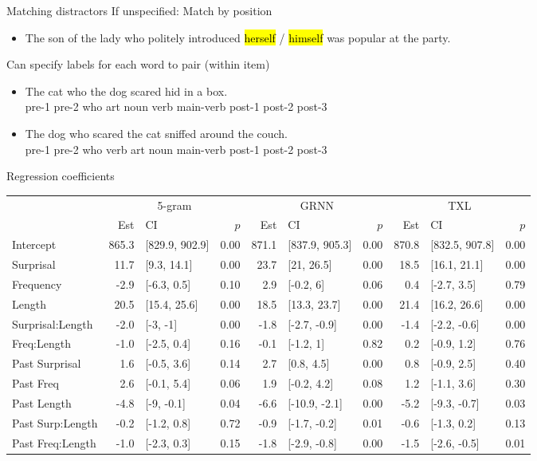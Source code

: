 \documentclass[ 12pt, xcolor=beamer,table,usenames,dvipsnames, ignorenonframetext, ngerman]{beamer}
\makeatletter
\let\HL\hl
\renewcommand\hl{%
	\let\set@color\beamerorig@set@color
	\let\reset@color\beamerorig@reset@color
	\HL}
\makeatother
\begin{document}
\appendix

\begin{frame}{Matching distractors}
If unspecified: Match by position
\begin{itemize}
	\item The son of the lady who politely introduced  \hl{herself} / \hl{himself} was popular at the party.
\end{itemize}
Can specify labels for each word to pair (within item)
\begin{itemize}
	\item The cat who the dog scared hid in a box.\\pre-1 pre-2 who art noun verb main-verb post-1 post-2 post-3
\item The dog who scared the cat sniffed around the couch.\\ pre-1 pre-2 who verb art noun main-verb post-1 post-2 post-3
\end{itemize}
\end{frame}


\begin{frame}{Regression coefficients}
\begin{tiny}
\begin{tabular}{l|rlr|rlr|rlr}
	\hline
	&\multicolumn{3}{c|}{5-gram}&\multicolumn{3}{c|}{GRNN}&\multicolumn{3}{c}{TXL}\\
	& Est & CI & $p$ & Est & CI & $p$ &Est & CI & $p$ \\ 
	\hline
	Intercept & 865.3 & [829.9, 902.9] & 0.00 & 871.1 & [837.9, 905.3] & 0.00 & 870.8 & [832.5, 907.8] & 0.00 \\ 
	Surprisal & 11.7 & [9.3, 14.1] & 0.00 & 23.7 & [21, 26.5] & 0.00 & 18.5 & [16.1, 21.1] & 0.00 \\ 
	Frequency & -2.9 & [-6.3, 0.5] & 0.10 & 2.9 & [-0.2, 6] & 0.06 & 0.4 & [-2.7, 3.5] & 0.79 \\ 
	Length & 20.5 & [15.4, 25.6] & 0.00 & 18.5 & [13.3, 23.7] & 0.00 & 21.4 & [16.2, 26.6] & 0.00 \\ 
	Surprisal:Length & -2.0 & [-3, -1] & 0.00 & -1.8 & [-2.7, -0.9] & 0.00 & -1.4 & [-2.2, -0.6] & 0.00 \\
	Freq:Length & -1.0 & [-2.5, 0.4] & 0.16 & -0.1 & [-1.2, 1] & 0.82 & 0.2 & [-0.9, 1.2] & 0.76 \\ 
	\hline
	Past Surprisal & 1.6 & [-0.5, 3.6] & 0.14 & 2.7 & [0.8, 4.5] & 0.00 & 0.8 & [-0.9, 2.5] & 0.40 \\ 
	Past Freq & 2.6 & [-0.1, 5.4] & 0.06 & 1.9 & [-0.2, 4.2] & 0.08 & 1.2 & [-1.1, 3.6] & 0.30 \\ 
	Past Length & -4.8 & [-9, -0.1] & 0.04 & -6.6 & [-10.9, -2.1] & 0.00 & -5.2 & [-9.3, -0.7] & 0.03 \\ 
	Past Surp:Length & -0.2 & [-1.2, 0.8] & 0.72 & -0.9 & [-1.7, -0.2] & 0.01 & -0.6 & [-1.3, 0.2] & 0.13 \\ 
	Past Freq:Length & -1.0 & [-2.3, 0.3] & 0.15 & -1.8 & [-2.9, -0.8] & 0.00 & -1.5 & [-2.6, -0.5] & 0.01 \\ 	
	\hline
\end{tabular}
\end{tiny}
\end{frame}
\end{document}
